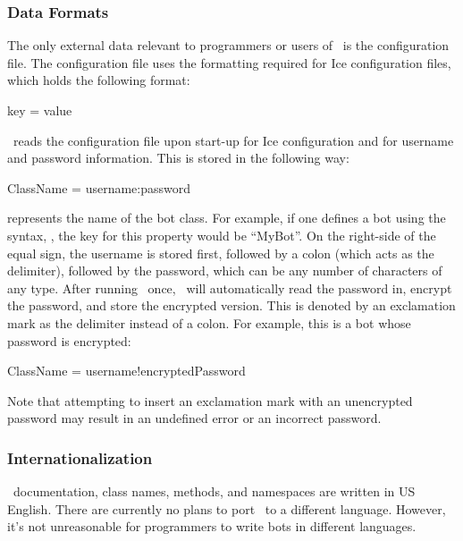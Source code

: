 \subsubsection*{Data Formats}

The only external data relevant to programmers or users of \AI\ is the configuration file. The configuration file uses the formatting required for Ice configuration files, which holds the following format:

\begin{command}
key = value
\end{command}

\AI\ reads the configuration file upon start-up for Ice configuration and for username and password information. This is stored in the following way:

\begin{command}
ClassName = username:password
\end{command}

 represents the name of the bot class. For example, if one defines a bot using the syntax, , the key for this property would be ``MyBot''. On the right-side of the equal sign, the username is stored first, followed by a colon (which acts as the delimiter), followed by the password, which can be any number of characters of any type. After running \AI\ once, \AI\ will automatically read the password in, encrypt the password, and store the encrypted version. This is denoted by an exclamation mark as the delimiter instead of a colon. For example, this is a bot whose password is encrypted:

\begin{command}
ClassName = username!encryptedPassword
\end{command}

Note that attempting to insert an exclamation mark with an unencrypted password may result in an undefined error or an incorrect password.

\subsubsection*{Internationalization}

\AI\ documentation, class names, methods, and namespaces are written in US English. There are currently no plans to port \AI\ to a different language. However, it's not unreasonable for programmers to write bots in different languages.
